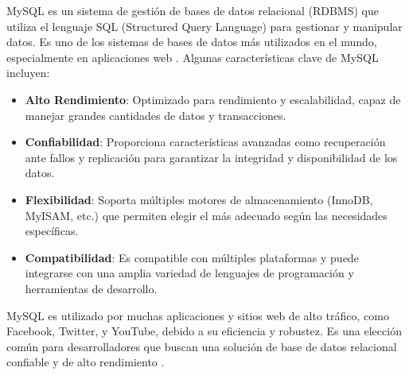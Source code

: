 MySQL es un sistema de gestión de bases de datos relacional (RDBMS) que utiliza el lenguaje SQL (Structured Query Language) para gestionar y manipular datos. Es uno de los sistemas de bases de datos más utilizados en el mundo, especialmente en aplicaciones web \cite{mysql}. Algunas características clave de MySQL incluyen:

\begin{itemize}
    \item \textbf{Alto Rendimiento}: Optimizado para rendimiento y escalabilidad, capaz de manejar grandes cantidades de datos y transacciones.
    \item \textbf{Confiabilidad}: Proporciona características avanzadas como recuperación ante fallos y replicación para garantizar la integridad y disponibilidad de los datos.
    \item \textbf{Flexibilidad}: Soporta múltiples motores de almacenamiento (InnoDB, MyISAM, etc.) que permiten elegir el más adecuado según las necesidades específicas.
    \item \textbf{Compatibilidad}: Es compatible con múltiples plataformas y puede integrarse con una amplia variedad de lenguajes de programación y herramientas de desarrollo.
\end{itemize}

MySQL es utilizado por muchas aplicaciones y sitios web de alto tráfico, como Facebook, Twitter, y YouTube, debido a su eficiencia y robustez. Es una elección común para desarrolladores que buscan una solución de base de datos relacional confiable y de alto rendimiento \cite{mysqlcookbook}.


